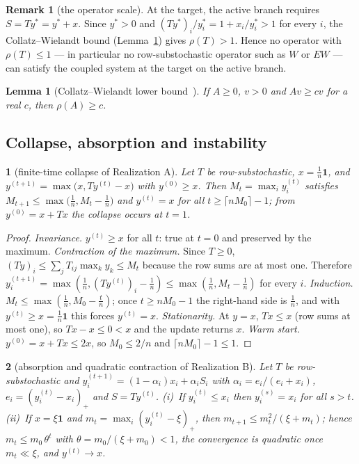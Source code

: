 \documentclass[11pt,a4paper]{article}
\newtheorem{lemma}{Lemma}
\theoremstyle{definition}
\newtheorem{remark}{Remark}
\theoremstyle{plain}
\newcommand{\genpropname}{}
\newtheorem*{genprop}{\genpropname}
\newenvironment{prop}[1]{\renewcommand{\genpropname}{Proposition #1}\begin{genprop}}{\end{genprop}}
\newcommand{\one}{\mathbf{1}}
\begin{document}
\begin{remark}[the operator scale]\label{rem:scale}
At the target, the active branch requires $S=Ty^*=y^*+x$. Since $y^*>0$ and $(Ty^*)_i/y^*_i=1+x_i/y^*_i>1$ for every $i$, the Collatz--Wielandt bound (Lemma~\ref{lem:cw}) gives $\rho(T)>1$. Hence no operator with $\rho(T)\le1$ --- in particular no row-substochastic operator such as $W$ or $EW$ --- can satisfy the coupled system at the target on the active branch.
\end{remark}

\begin{lemma}[Collatz--Wielandt lower bound~{\cite[Thm.~8.1.26]{hornjohnson13}}]\label{lem:cw}
If $A\ge0$, $v>0$ and $Av\ge cv$ for a real $c$, then $\rho(A)\ge c$.
\end{lemma}

\subsection{Collapse, absorption and instability}

\begin{prop}{A}[finite-time collapse of Realization A]
Let $T$ be row-substochastic, $x=\tfrac1n\one$, and $y^{(t+1)}=\max\big(x,Ty^{(t)}-x\big)$ with $y^{(0)}\ge x$. Then $M_t=\max_iy_i^{(t)}$ satisfies $M_{t+1}\le\max\big(\tfrac1n,M_t-\tfrac1n\big)$ and $y^{(t)}=x$ for all $t\ge\lceil nM_0\rceil-1$; from $y^{(0)}=x+Tx$ the collapse occurs at $t=1$.
\end{prop}

\begin{proof}
\emph{Invariance.} $y^{(t)}\ge x$ for all $t$: true at $t=0$ and preserved by the maximum. \emph{Contraction of the maximum.} Since $T\ge0$, $(Ty)_i\le\sum_jT_{ij}\max_ky_k\le M_t$ because the row sums are at most one. Therefore $y_i^{(t+1)}=\max(\tfrac1n,(Ty^{(t)})_i-\tfrac1n)\le\max(\tfrac1n,M_t-\tfrac1n)$ for every $i$. \emph{Induction.} $M_t\le\max(\tfrac1n,M_0-\tfrac tn)$; once $t\ge nM_0-1$ the right-hand side is $\tfrac1n$, and with $y^{(t)}\ge x=\tfrac1n\one$ this forces $y^{(t)}=x$. \emph{Stationarity.} At $y=x$, $Tx\le x$ (row sums at most one), so $Tx-x\le0<x$ and the update returns $x$. \emph{Warm start.} $y^{(0)}=x+Tx\le2x$, so $M_0\le2/n$ and $\lceil nM_0\rceil-1\le1$.
\end{proof}

\begin{prop}{B}[absorption and quadratic contraction of Realization B]
Let $T$ be row-substochastic and $y^{(t+1)}_i=(1-\alpha_i)x_i+\alpha_iS_i$ with $\alpha_i=e_i/(e_i+x_i)$, $e_i=(y_i^{(t)}-x_i)_+$ and $S=Ty^{(t)}$. (i)~If $y_i^{(t)}\le x_i$ then $y_i^{(s)}=x_i$ for all $s>t$. (ii)~If $x=\xi\one$ and $m_t=\max_i(y_i^{(t)}-\xi)_+$, then $m_{t+1}\le m_t^2/(\xi+m_t)$; hence $m_t\le m_0\,\theta^t$ with $\theta=m_0/(\xi+m_0)<1$, the convergence is quadratic once $m_t\ll\xi$, and $y^{(t)}\to x$.
\end{prop}
\end{document}
